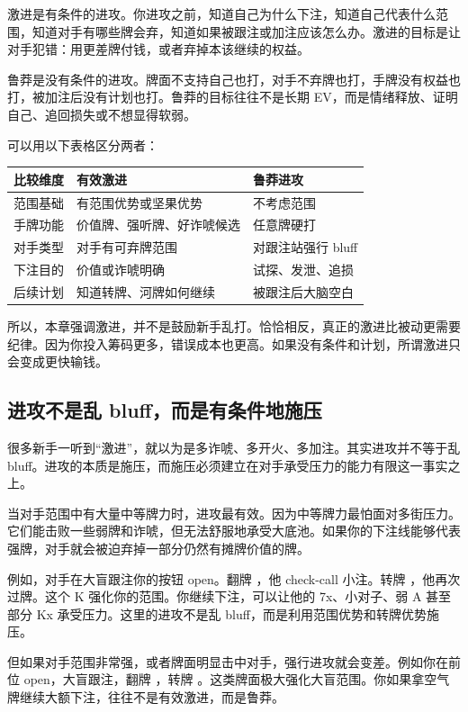 激进是有条件的进攻。你进攻之前，知道自己为什么下注，知道自己代表什么范围，知道对手有哪些牌会弃，知道如果被跟注或加注应该怎么办。激进的目标是让对手犯错：用更差牌付钱，或者弃掉本该继续的权益。

鲁莽是没有条件的进攻。牌面不支持自己也打，对手不弃牌也打，手牌没有权益也打，被加注后没有计划也打。鲁莽的目标往往不是长期 EV，而是情绪释放、证明自己、追回损失或不想显得软弱。

可以用以下表格区分两者：

\begin{center}
\begin{tabular}{lll}
\toprule
\textbf{比较维度} & \textbf{有效激进} & \textbf{鲁莽进攻} \\
\midrule
范围基础 & 有范围优势或坚果优势 & 不考虑范围 \\
手牌功能 & 价值牌、强听牌、好诈唬候选 & 任意牌硬打 \\
对手类型 & 对手有可弃牌范围 & 对跟注站强行 bluff \\
下注目的 & 价值或诈唬明确 & 试探、发泄、追损 \\
后续计划 & 知道转牌、河牌如何继续 & 被跟注后大脑空白 \\
\bottomrule
\end{tabular}
\end{center}

所以，本章强调激进，并不是鼓励新手乱打。恰恰相反，真正的激进比被动更需要纪律。因为你投入筹码更多，错误成本也更高。如果没有条件和计划，所谓激进只会变成更快输钱。

\subsection{进攻不是乱 bluff，而是有条件地施压}

很多新手一听到“激进”，就以为是多诈唬、多开火、多加注。其实进攻并不等于乱 bluff。进攻的本质是施压，而施压必须建立在对手承受压力的能力有限这一事实之上。

当对手范围中有大量中等牌力时，进攻最有效。因为中等牌力最怕面对多街压力。它们能击败一些弱牌和诈唬，但无法舒服地承受大底池。如果你的下注线能够代表强牌，对手就会被迫弃掉一部分仍然有摊牌价值的牌。

例如，对手在大盲跟注你的按钮 open。翻牌 ，他 check-call 小注。转牌 ，他再次过牌。这个 K 强化你的范围。你继续下注，可以让他的 7x、小对子、弱 A 甚至部分 Kx 承受压力。这里的进攻不是乱 bluff，而是利用范围优势和转牌优势施压。

但如果对手范围非常强，或者牌面明显击中对手，强行进攻就会变差。例如你在前位 open，大盲跟注，翻牌 ，转牌 。这类牌面极大强化大盲范围。你如果拿空气牌继续大额下注，往往不是有效激进，而是鲁莽。

